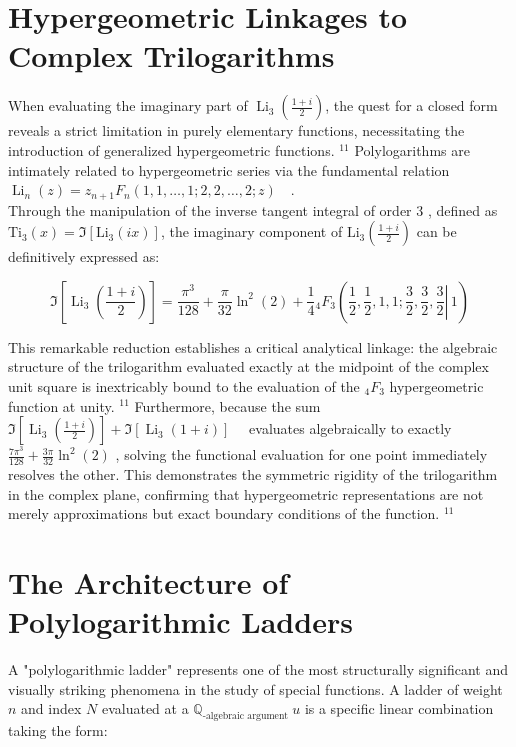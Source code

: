 \documentclass[10pt]{article}
\begin{document}
\section*{Hypergeometric Linkages to Complex Trilogarithms}
When evaluating the imaginary part of $\operatorname{Li}_{3}\left(\frac{1+i}{2}\right)$, the quest for a closed form reveals a strict limitation in purely elementary functions, necessitating the introduction of generalized hypergeometric functions. ${ }^{11}$ Polylogarithms are intimately related to hypergeometric series via the fundamental relation $\operatorname{Li}_{n}(z)=z_{n+1} F_{n}(1,1, \ldots, 1 ; 2,2, \ldots, 2 ; z) \quad$.\\
Through the manipulation of the inverse tangent integral of order 3 , defined as $\mathrm{Ti}_{3}(x)=\Im\left[\mathrm{Li}_{3}(i x)\right]$, the imaginary component of $\mathrm{Li}_{3}\left(\frac{1+i}{2}\right)$ can be definitively expressed as:

$$
\Im\left[\operatorname{Li}_{3}\left(\frac{1+i}{2}\right)\right]=\frac{\pi^{3}}{128}+\frac{\pi}{32} \ln ^{2}(2)+\frac{1}{4}{ }_{4} F_{3}\left(\frac{1}{2}, \frac{1}{2}, 1,1 ; \frac{3}{2}, \frac{3}{2}, \left.\frac{3}{2} \right\rvert\, 1\right)
$$

This remarkable reduction establishes a critical analytical linkage: the algebraic structure of the trilogarithm evaluated exactly at the midpoint of the complex unit square is inextricably bound to the evaluation of the ${ }_{4} F_{3}$ hypergeometric function at unity. ${ }^{11}$ Furthermore, because the sum $\Im\left[\operatorname{Li}_{3}\left(\frac{1+i}{2}\right)\right]+\Im\left[\operatorname{Li}_{3}(1+i)\right] \quad$ evaluates algebraically to exactly $\frac{7 \pi^{3}}{128}+\frac{3 \pi}{32} \ln ^{2}(2)$ , solving the functional evaluation for one point immediately resolves the other. This demonstrates the symmetric rigidity of the trilogarithm in the complex plane, confirming that hypergeometric representations are not merely approximations but exact boundary conditions of the function. ${ }^{11}$

\section*{The Architecture of Polylogarithmic Ladders}
A "polylogarithmic ladder" represents one of the most structurally significant and visually striking phenomena in the study of special functions. A ladder of weight $n$ and index $N$ evaluated at a $\mathbb{Q}_{\text {-algebraic argument }} u$ is a specific linear combination taking the form:
\end{document}
